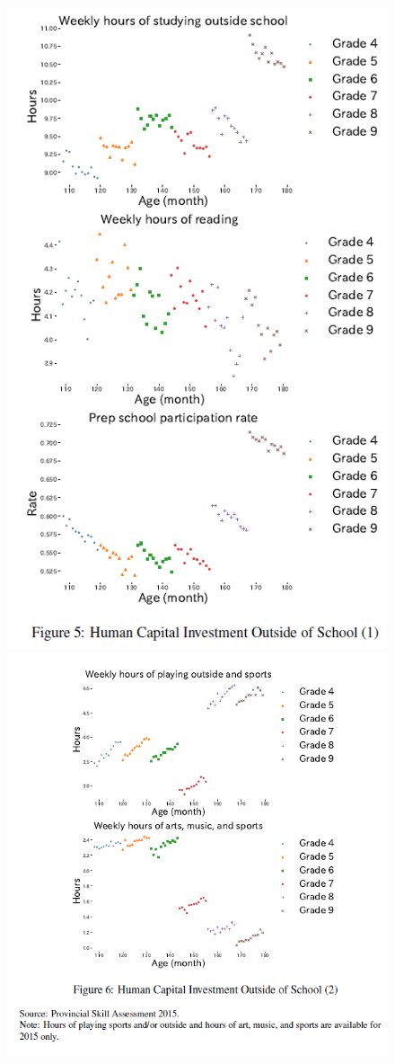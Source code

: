 \documentclass[../root]{subfiles}
\begin{document}
    \begin{figure}[ht]
      \centering
      \includegraphics[scale = 1]{0904tanji/F5}
      \includegraphics[scale = 1]{0904tanji/F6}

\end{figure}
\end{document}
